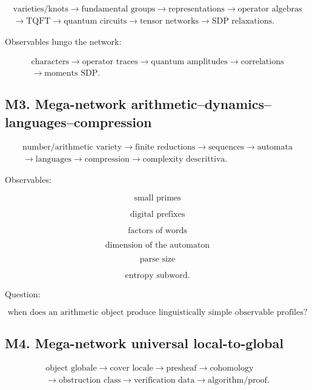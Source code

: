 \documentclass[11pt]{article}
\begin{document}
\[
\begin{gathered}
\text{varieties/knots} \to \text{fundamental groups} \to \text{representations} \to \text{operator algebras} \\
\to \text{TQFT} \to \text{quantum circuits} \to \text{tensor networks} \to \text{SDP relaxations}.
\end{gathered}
\]

Observables lungo the network:

\[
\begin{gathered}
\text{characters} \to \text{operator traces} \to \text{quantum amplitudes} \to \text{correlations} \\
\to \text{moments SDP}.
\end{gathered}
\]



\subsection{M3. Mega-network arithmetic--dynamics--languages--compression}

\[
\begin{gathered}
\text{number/arithmetic variety} \to \text{finite reductions} \to \text{sequences} \to \text{automata} \\
\to \text{languages} \to \text{compression} \to \text{complexity descrittiva}.
\end{gathered}
\]

Observables:

\[
\text{small primes}
\]

\[
\text{digital prefixes}
\]

\[
\text{factors of words}
\]

\[
\text{dimension of the automaton}
\]

\[
\text{parse size}
\]

\[
\text{entropy subword}.
\]

Question:

\[
\text{when does an arithmetic object produce linguistically simple observable profiles?}
\]



\subsection{M4. Mega-network universal local-to-global}

\[
\begin{gathered}
\text{object globale} \to \text{cover locale} \to \text{presheaf} \to \text{cohomology} \\
\to \text{obstruction class} \to \text{verification data} \to \text{algorithm/proof}.
\end{gathered}
\]
\end{document}

